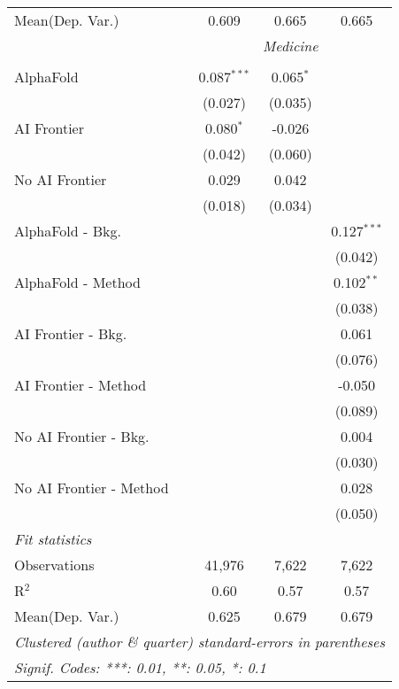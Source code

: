 \begin{tabular}{lccc}
Mean(Dep. Var.) & 0.609 & 0.665 & 0.665 \\
 & \multicolumn{3}{c}{\textit{Medicine}} \\ \\
   AlphaFold               & 0.087$^{***}$ & 0.065$^{*}$ &   \\   
                           & (0.027)       & (0.035)     &   \\   
   AI Frontier             & 0.080$^{*}$   & -0.026      &   \\   
                           & (0.042)       & (0.060)     &   \\   
   No AI Frontier          & 0.029         & 0.042       &   \\   
                           & (0.018)       & (0.034)     &   \\   
   AlphaFold - Bkg.        &               &             & 0.127$^{***}$\\   
                           &               &             & (0.042)\\   
   AlphaFold - Method      &               &             & 0.102$^{**}$\\   
                           &               &             & (0.038)\\   
   AI Frontier - Bkg.      &               &             & 0.061\\   
                           &               &             & (0.076)\\   
   AI Frontier - Method    &               &             & -0.050\\   
                           &               &             & (0.089)\\   
   No AI Frontier - Bkg.   &               &             & 0.004\\   
                           &               &             & (0.030)\\   
   No AI Frontier - Method &               &             & 0.028\\   
                           &               &             & (0.050)\\   
   \midrule
   \emph{Fit statistics}\\
   Observations            & 41,976        & 7,622       & 7,622\\  
   R$^2$                   & 0.60          & 0.57        & 0.57\\  
Mean(Dep. Var.) & 0.625 & 0.679 & 0.679 \\
   \midrule \midrule
   \multicolumn{4}{l}{\emph{Clustered (author \& quarter) standard-errors in parentheses}}\\
   \multicolumn{4}{l}{\emph{Signif. Codes: ***: 0.01, **: 0.05, *: 0.1}}\\
\end{tabular}
\par\endgroup
